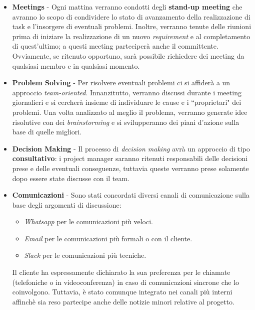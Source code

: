 \begin{itemize}
    \item \textbf{Meetings} - Ogni mattina verranno condotti degli \textbf{stand-up meeting} che avranno lo scopo di condividere lo stato di avanzamento della realizzazione di task e l'insorgere di eventuali problemi. Inoltre, verranno tenute delle riunioni prima di iniziare la realizzazione di un nuovo \textit{requirement} e al completamento di quest'ultimo; a questi meeting parteciperà anche il committente. Ovviamente, se ritenuto opportuno, sarà possibile richiedere dei meeting da qualsiasi membro e in qualsiasi momento.
    \item \textbf{Problem Solving} - Per risolvere eventuali problemi ci si affiderà a un approccio \textit{team-oriented}. Innanzitutto, verranno discussi durante i meeting giornalieri e si cercherà insieme di individuare le cause e i ``proprietari" dei problemi. Una volta analizzato al meglio il problema, verranno generate idee risolutive con dei \textit{brainstorming} e si svilupperanno dei piani d'azione sulla base di quelle migliori.
    \item \textbf{Decision Making} - Il processo di \textit{decision making} avrà un approccio di tipo \textbf{consultativo}: i project manager saranno ritenuti responsabili delle decisioni prese e delle eventuali conseguenze, tuttavia queste verranno prese solamente dopo essere state discusse con il team.
    \item \textbf{Comunicazioni} - Sono stati concordati diversi canali di comunicazione sulla base degli argomenti di discussione:
    \begin{itemize}
        \item \textit{Whatsapp} per le comunicazioni più veloci.
        \item \textit{Email} per le comunicazioni più formali o con il cliente.
        \item \textit{Slack} per le comunicazioni più tecniche.
    \end{itemize}
    Il cliente ha espressamente dichiarato la sua preferenza per le chiamate (telefoniche o in videoconferenza) in caso di comunicazioni sincrone che lo coinvolgono. Tuttavia, è stato comunque integrato nei canali più interni affinchè sia reso partecipe anche delle notizie minori relative al progetto.
\end{itemize}

